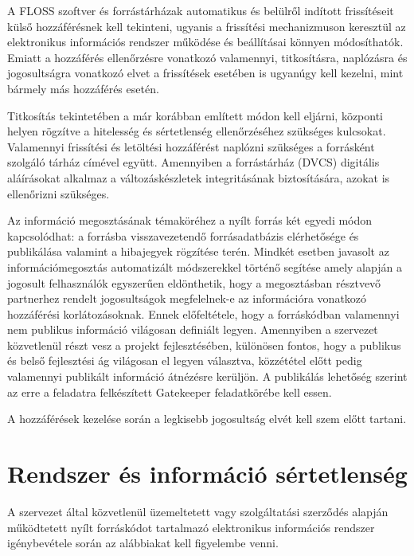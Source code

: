 \documentclass[12pt,magyar,a4paper,oneside]{scrreprt}
\begin{document}
A FLOSS szoftver és forrástárházak automatikus és belülről indított
frissítéseit külső hozzáférésnek kell tekinteni, ugyanis a frissítési
mechanizmuson keresztül az elektronikus információs rendszer működése és
beállításai könnyen módosíthatók. Emiatt a hozzáférés ellenőrzésre
vonatkozó valamennyi, titkosításra, naplózásra és jogosultságra
vonatkozó elvet a frissítések esetében is ugyanúgy kell kezelni, mint
bármely más hozzáférés esetén.

Titkosítás tekintetében a már korábban említett módon kell eljárni,
központi helyen rögzítve a hitelesség és sértetlenség ellenőrzéséhez
szükséges kulcsokat. Valamennyi frissítési és letöltési hozzáférést
naplózni szükséges a forrásként szolgáló tárház címével együtt.
Amennyiben a forrástárház (DVCS) digitális aláírásokat alkalmaz a
változáskészletek integritásának biztosítására, azokat is ellenőrizni
szükséges.

Az információ megosztásának témaköréhez a nyílt forrás két egyedi módon
kapcsolódhat: a forrásba visszavezetendő forrásadatbázis elérhetősége és
publikálása valamint a hibajegyek rögzítése terén. Mindkét esetben
javasolt az információmegosztás automatizált módszerekkel történő
segítése amely alapján a jogosult felhasználók egyszerűen eldönthetik,
hogy a megosztásban résztvevő partnerhez rendelt jogosultságok
megfelelnek-e az információra vonatkozó hozzáférési korlátozásoknak.
Ennek előfeltétele, hogy a forráskódban valamennyi nem publikus
információ világosan definiált legyen. Amennyiben a szervezet
közvetlenül részt vesz a projekt fejlesztésében, különösen fontos, hogy
a publikus és belső fejlesztési ág világosan el legyen választva,
közzététel előtt pedig valamennyi publikált információ átnézésre
kerüljön. A publikálás lehetőség szerint az erre a feladatra
felkészített Gatekeeper feladatkörébe kell essen.

A hozzáférések kezelése során a legkisebb jogosultság elvét kell szem
előtt tartani.

\hypertarget{rendszer-uxe9s-informuxe1ciuxf3-suxe9rtetlensuxe9g}{%
\section{Rendszer és információ
sértetlenség}\label{rendszer-uxe9s-informuxe1ciuxf3-suxe9rtetlensuxe9g}}

A szervezet által közvetlenül üzemeltetett vagy szolgáltatási szerződés
alapján működtetett nyílt forráskódot tartalmazó elektronikus
információs rendszer igénybevétele során az alábbiakat kell figyelembe
venni.
\end{document}

